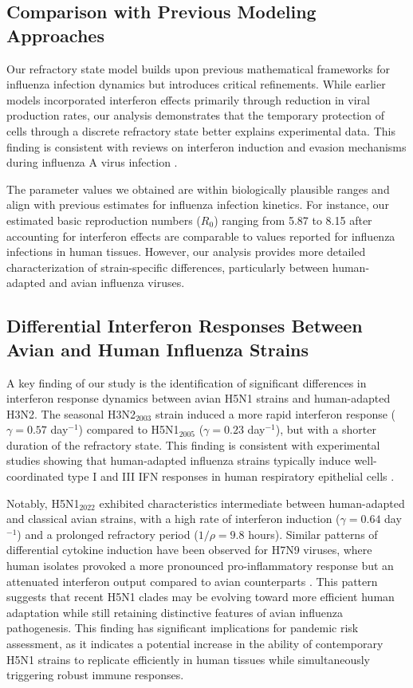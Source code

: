\documentclass[12pt]{article}
\begin{document}
\subsection{Comparison with Previous Modeling Approaches}
Our refractory state model builds upon previous mathematical frameworks for influenza infection dynamics but introduces critical refinements. While earlier models incorporated interferon effects primarily through reduction in viral production rates, our analysis demonstrates that the temporary protection of cells through a discrete refractory state better explains experimental data. This finding is consistent with reviews on interferon induction and evasion mechanisms during influenza A virus infection \cite{munozmoreno20}.

The parameter values we obtained are within biologically plausible ranges and align with previous estimates for influenza infection kinetics. For instance, our estimated basic reproduction numbers ($R_0$) ranging from 5.87 to 8.15 after accounting for interferon effects are comparable to values reported for influenza infections in human tissues. However, our analysis provides more detailed characterization of strain-specific differences, particularly between human-adapted and avian influenza viruses.

\subsection{Differential Interferon Responses Between Avian and Human Influenza Strains}
A key finding of our study is the identification of significant differences in interferon response dynamics between avian H5N1 strains and human-adapted H3N2. The seasonal H3N2$_{2003}$ strain induced a more rapid interferon response ($\gamma = 0.57$ day$^{-1}$) compared to H5N1$_{2005}$ ($\gamma = 0.23$ day$^{-1}$), but with a shorter duration of the refractory state. This finding is consistent with experimental studies showing that human-adapted influenza strains typically induce well-coordinated type I and III IFN responses in human respiratory epithelial cells \cite{wenxin20}.

Notably, H5N1$_{2022}$ exhibited characteristics intermediate between human-adapted and classical avian strains, with a high rate of interferon induction ($\gamma = 0.64$ day$^{-1}$) and a prolonged refractory period ($1/\rho = 9.8$ hours). Similar patterns of differential cytokine induction have been observed for H7N9 viruses, where human isolates provoked a more pronounced pro-inflammatory response but an attenuated interferon output compared to avian counterparts \cite{to16}. This pattern suggests that recent H5N1 clades may be evolving toward more efficient human adaptation while still retaining distinctive features of avian influenza pathogenesis. This finding has significant implications for pandemic risk assessment, as it indicates a potential increase in the ability of contemporary H5N1 strains to replicate efficiently in human tissues while simultaneously triggering robust immune responses.
\end{document}
